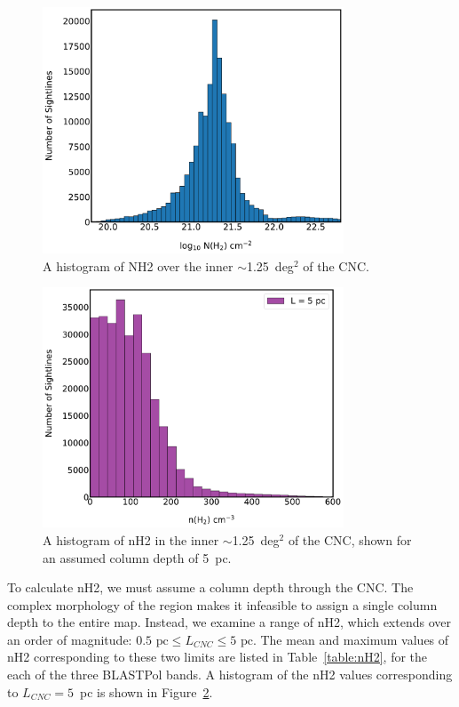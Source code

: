 \begin{figure}[!htbp]
\centering
\includegraphics[width=0.8\textwidth]{figures/carina/NH2_hist_500}
\caption[~A histogram of  over the inner  of the CNC.]{A histogram of \gls{NH2} over the inner $\sim$1.25~deg$^{2}$ of the CNC.}
\label{fig:NH2_hist}
\end{figure}

\begin{figure}[!htbp]
\centering
\includegraphics[width=0.8\textwidth]{figures/carina/nH2_hist_500}
\caption[~A histogram of  in the inner  of the CNC.]{A histogram of \gls{nH2} in the inner $\sim$1.25~deg$^{2}$ of the CNC, shown for an assumed column depth of 5~pc.}
\label{fig:nH2_hist}
\end{figure}

To calculate \gls{nH2}, we must assume a column depth through the CNC. The complex morphology of the region makes it infeasible to assign a single column depth to the entire map. Instead, we examine a range of \gls{nH2}, which extends over an order of magnitude: $0.5 \text{~pc} \leq L_{CNC} \leq 5 \text{~pc}$. The mean and maximum values of \gls{nH2} corresponding to these two limits are listed in Table~\ref{table:nH2}, for the each of the three BLASTPol bands. A histogram of the \gls{nH2} values corresponding to $L_{CNC} = 5$~pc is shown in Figure~\ref{fig:nH2_hist}.

